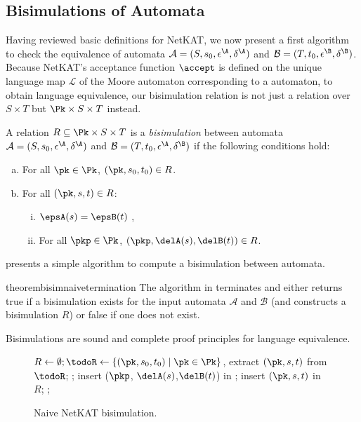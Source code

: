 \subsection{Bisimulations of \NetKAT Automata}

Having reviewed basic definitions for NetKAT, we now present a first
algorithm to check the equivalence of \NetKAT automata $\mathcal{A} =
(S, s_0, \epsilon^\A, \delta^\A)$ and $\mathcal{B} = (T, t_0,
\epsilon^\B, \delta^\B)$. Because NetKAT's acceptance function
$\accept$ is defined on the unique language map $\mathcal L$ of the
Moore automaton corresponding to a \NetKAT automaton, to obtain
language equivalence, our bisimulation relation is not just a relation
over $S\times T$ but $\Pk\times S\times T$ instead.

\begin{definition}[Bisimulation]\label{def:bisim}
    A relation $R
    \subseteq \Pk \times S\times T$ is a \emph{bisimulation} between \NetKAT
    automata $\mathcal{A} = (S, s_0, \epsilon^\A, \delta^\A)$
    and $\mathcal{B} = (T, t_0, \epsilon^\A, \delta^\B)$ if the following conditions hold:
\begin{enumerate}[(a)]
    \item For all $\pk\in\Pk$, $(\pk, s_0, t_0) \in R$.
    \item For all $(\pk,s,t)\in R$:
    \begin{enumerate}[(i)]
    \item $\epsA(s) = \epsB(t)$ ,
    \item For all $\pkp\in\Pk$,  $(\pkp, \delA(s), \delB(t))\in R$.
    \end{enumerate}
\end{enumerate}
\end{definition}

\noindent {} presents a simple algorithm to compute a
bisimulation between \NetKAT automata.

\begin{restatable}{theorem}{bisimnaivetermination}
The algorithm in  terminates and either returns true
if a bisimulation exists for the input \NetKAT automata $\mathcal A$
and $\mathcal B$ (and constructs a bisimulation $R$) or false if one
does not exist.
\end{restatable}

\noindent Bisimulations are sound and complete proof principles for
\NetKAT language equivalence.

\begin{figure}
\begin{algorithmic}
\State $R\gets \emptyset; \todoR \gets \{(\pk,s_0,t_0)\mid \pk\in \Pk\}$,
    \State extract $(\pk, s,t)$ from $\todoR$;
      \Return \false;
	\EndIf
      \For {$\pkp \in \Pk$}
     	insert ($\pkp$, $\delA(s)$,$\delB(t)$) in \todoR;
\EndFor
    \EndIf
     insert $(\pk,s,t)$ in $R$;
\EndWhile
\State
\Return \true;
\end{algorithmic}
\caption{Naive NetKAT bisimulation.}
\label{fig:naive}
\end{figure}

